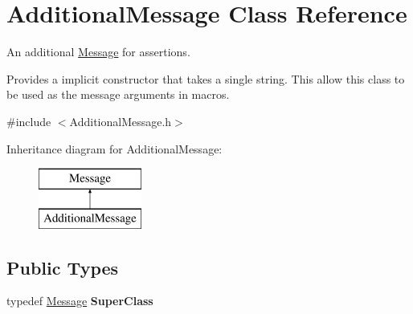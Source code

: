 \hypertarget{class_additional_message}{}\section{Additional\+Message Class Reference}
\label{class_additional_message}


An additional \hyperlink{class_message}{Message} for assertions.

Provides a implicit constructor that takes a single string. This allow this class to be used as the message arguments in macros.  




{\ttfamily \#include $<$Additional\+Message.\+h$>$}

Inheritance diagram for Additional\+Message\+:\begin{figure}[H]
\begin{center}
\leavevmode
\includegraphics[height=2.000000cm]{class_additional_message}
\end{center}
\end{figure}
\subsection*{Public Types}
\begin{DoxyCompactItemize}
\item 
typedef \hyperlink{class_message}{Message} {\bfseries Super\+Class}\hypertarget{class_additional_message_abc8626e28c147b5ddd66032a35676126}{}\label{class_additional_message_abc8626e28c147b5ddd66032a35676126}

\end{DoxyCompactItemize}
